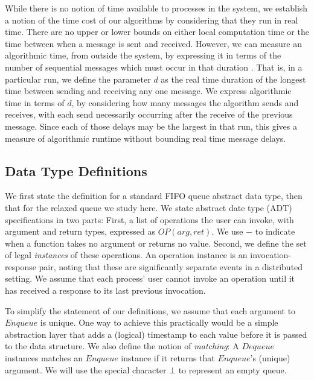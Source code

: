 \documentclass[a4paper,USenglish]{lipics-v2021} %
\begin{document}
While there is no notion of time available to processes in the system, we establish a notion of the time cost of our algorithms by considering that they run in real time.  There are no upper or lower bounds on either local computation time or the time between when a message is sent and received.  However, we can measure an algorithmic time, from outside the system, by expressing it in terms of the number of sequential messages which must occur in that duration \cite{AttiyaWelch04}.  That is, in a particular run, we define the parameter $d$ as the real time duration of the longest time between sending and receiving any one message.  We express algorithmic time in terms of $d$, by considering how many messages the algorithm sends and receives, with each send necessarily occurring after the receive of the previous message.  Since each of those delays may be the largest in that run, this gives a measure of algorithmic runtime without bounding real time message delays.  

\subsection{Data Type Definitions}

We first state the definition for a standard FIFO queue abstract data type, then that for the relaxed queue we study here.  We state abstract date type (ADT) specifications in two parts: First, a list of operations the user can invoke, with argument and return types, expressed as $OP(arg,ret)$.  We use $-$ to indicate when a function takes no argument or returns no value.  Second, we define the set of legal \emph{instances} of these operations.  An operation instance is an invocation-response pair, noting that these are significantly separate events in a distributed setting.  We assume that each process' user cannot invoke an operation until it has received a response to its last previous invocation.   

To simplify the statement of our definitions, we assume that each argument to $Enqueue$ is unique.  One way to achieve this practically would be a simple abstraction layer that adds a (logical) timestamp to each value before it is passed to the data structure.  We also define the notion of \emph{matching}: A $Dequeue$ instances matches an $Enqueue$ instance if it returns that $Enqueue$'s (unique) argument.  We will use the special character $\bot$ to represent an empty queue.
\end{document}
